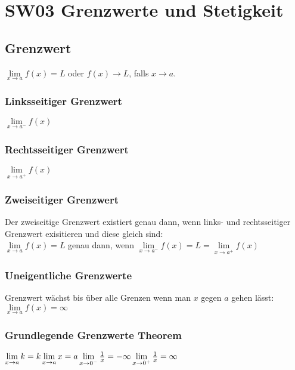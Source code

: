 \documentclass[../main.tex]{subfiles}
\begin{document}

\chapter{SW03 Grenzwerte und Stetigkeit}
\section{Grenzwert}
$\lim\limits_{x\to a}f(x)=L$ oder $f(x)\to L$, falls $x\to a$.

\subsection{Linksseitiger Grenzwert}
$\lim\limits_{x\to a^-}f(x)$

\subsection{Rechtsseitiger Grenzwert}
$\lim\limits_{x\to a^+}f(x)$

\subsection{Zweiseitiger Grenzwert}
Der zweiseitige Grenzwert existiert genau dann, wenn links- und rechtsseitiger Grenzwert exisitieren und diese gleich sind: \\ [7pt]
$\lim\limits_{x\to a}f(x)=L$ genau dann, wenn $\lim\limits_{x\to a^-}f(x)=L=\lim\limits_{x\to a^+}f(x)$

\subsection{Uneigentliche Grenzwerte}
Grenzwert wächst bis über alle Grenzen wenn man $x$ gegen $a$ gehen lässt: \\ [7pt]
$\lim\limits_{x\to a}f(x)=\infty$

\subsection{Grundlegende Grenzwerte Theorem}
\begin{math}
    \lim\limits_{x\to a} k = k \\ [7pt]
    \lim\limits_{x\to a} x = a \\ [7pt]
    \lim\limits_{x\to 0^-} \frac{1}{x} = -\infty \\ [7pt]
    \lim\limits_{x\to 0^+} \frac{1}{x} = \infty
\end{math}
\end{document}
